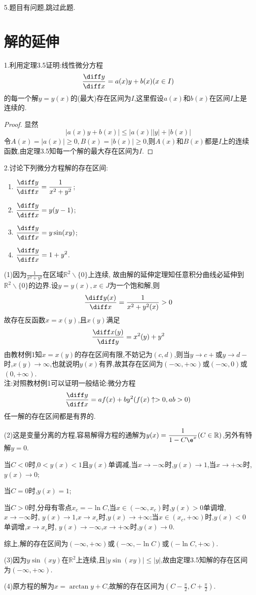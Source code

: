 5.题目有问题,跳过此题.


\section{解的延伸}


1.利用定理3.5证明:线性微分方程
\[\frac{\diff y}{\diff x}=a(x)y+b(x)(x\in I)\]
的每一个解$y=y(x)$的(最大)存在区间为$I$,这里假设$a(x)$和$b(x)$在区间$I$上是连续的.

\begin{proof}显然
\[|a(x)y+b(x)|\leq|a(x)||y|+|b(x)|\]
令$A(x)=|a(x)|\geq0,B(x)=|b(x)|\geq0$,则$A(x)$和$B(x)$都是$I$上的连续函数,由定理3.5知每一个解的最大存在区间为$I$.
\end{proof}


2.讨论下列微分方程解的存在区间:
\begin{enumerate}[(1)]
\item $\displaystyle\frac{\diff y}{\diff x}=\frac{1}{x^2+y^2}$;
\item $\displaystyle\frac{\diff y}{\diff x}=y(y-1)$;
\item $\displaystyle\frac{\diff y}{\diff x}=y\sin(xy)$;
\item $\displaystyle\frac{\diff y}{\diff x}=1+y^2$.
\end{enumerate}

\begin{solve}
(1)因为$\frac{1}{x^2+y^2}$在区域$\mathbb{R}^2\backslash\{0\}$上连续,
故由解的延伸定理知任意积分曲线必延伸到$\mathbb{R}^2\backslash\{0\}$的边界.设$y=y(x),x\in J$为一个饱和解,则
\[\frac{\diff y(x)}{\diff x}=\frac{1}{x^2+y^2(x)}>0\]
故存在反函数$x=x(y)$,且$x(y)$满足
\[\frac{\diff x(y)}{\diff y}=x^2(y)+y^2\]
由教材例1知$x=x(y)$的存在区间有限,不妨记为$(c,d)$,则当$y\to c+$或$y\to d-$时,$x(y)\to\infty$,也就说明$y(x)$有界,故其存在区间为$(-\infty,+\infty)$或$(-\infty,0)$或$(0,+\infty)$.\\
注:对照教材例1可以证明一般结论:微分方程
\[\frac{\diff y}{\diff x}=af(x)+by^2(f(x)\uparrow>0,ab>0)\]
任一解的存在区间都是有界的.

(2)这是变量分离的方程,容易解得方程的通解为$\displaystyle y(x)=\frac{1}{1-C\e^x}(C\in\mathbb{R})$,另外有特解$y=0$.

当$C<0$时,$0<y(x)<1$且$y(x)$单调减,当$x\to-\infty$时,$y(x)\to1$,当$x\to+\infty$时,$y(x)\to0$;

当$C=0$时,$y(x)=1$;

当$C>0$时,分母有零点$x_c=-\ln C$,当$x\in(-\infty,x_c)$时,$y(x)>0$单调增,$x\to-\infty$时,
$y(x)\to1$,$x\to x_c$时,$y(x)\to+\infty$;当$x\in(x_c,+\infty)$时,$y(x)<0$单调增,$x\to x_c$时,
$y(x)\to-\infty$,$x\to+\infty$时,$y(x)\to0$.

综上,解的存在区间为$(-\infty,+\infty)$或$(-\infty,-\ln C)$或$(-\ln C,+\infty)$.

(3)因为$y\sin(xy)$在$\mathbb{R}^2$上连续,且$|y\sin(xy)|\leq|y|$,故由定理3.5知解的存在区间为$(-\infty,+\infty)$.

(4)原方程的解为$x=\arctan y+C$,故解的存在区间为$(C-\frac{\pi}{2},C+\frac{\pi}{2})$.
\end{solve}


